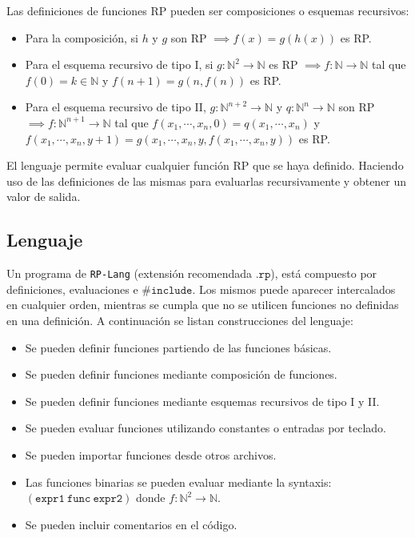 \documentclass{article}
\newcommand{\rplang}{\texttt{RP-Lang}}
\begin{document}
Las definiciones de funciones RP pueden ser composiciones o esquemas recursivos:
\begin{itemize}
\item Para la composición, si $h$ y $g$ son RP $\implies f(x) = g(h(x))$ es RP. 
\item Para el esquema recursivo de tipo I, si $g:\mathbb N^2\to\mathbb N$ es RP $\implies f:\mathbb N\to\mathbb N$ tal que $f(0) = k \in \mathbb N$ y $f(n + 1) = g(n, f(n))$ es RP.
\item Para el esquema recursivo de tipo II, $g:\mathbb N^{n+2}\to\mathbb N$ y $q:\mathbb N^{n}\to\mathbb N$ son RP $\implies f:\mathbb N^{n+1}\to\mathbb N$ tal que $f(x_1, \cdots, x_n, 0) = q(x_1, \cdots, x_n)$ y $f(x_1, \cdots, x_n, y + 1) = g(x_1, \cdots, x_n, y, f(x_1, \cdots, x_n, y))$ es RP.
\end{itemize}

El lenguaje permite evaluar cualquier función RP que se haya definido. Haciendo uso de las definiciones de las mismas para evaluarlas recursivamente y obtener un valor de salida. 

\subsection {Lenguaje}

Un programa de \rplang{} (extensión recomendada $\texttt{.rp}$), está compuesto por definiciones, evaluaciones e $\texttt{\#include}$. Los mismos puede aparecer intercalados en cualquier orden, mientras se cumpla que no se utilicen funciones no definidas en una definición. A continuación se listan construcciones del lenguaje:

\begin{itemize}
\item Se pueden definir funciones partiendo de las funciones básicas.
\item Se pueden definir funciones mediante composición de funciones.
\item Se pueden definir funciones mediante esquemas recursivos de tipo I y II.
\item Se pueden evaluar funciones utilizando constantes o entradas por teclado.
\item Se pueden importar funciones desde otros archivos.
\item Las funciones binarias se pueden evaluar mediante la syntaxis: $(\texttt{expr1}\ \texttt{func}\ \texttt{expr2})$ donde $f:\mathbb N^2\to\mathbb N$.
\item Se pueden incluir comentarios en el código.
\end{itemize}
\end{document}
